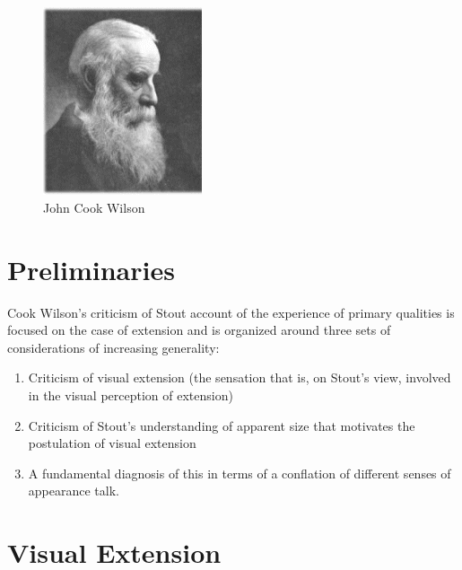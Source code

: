 \documentclass[11pt]{article}
\title{\mytitle\\
\mysubtitle}
\author{\myauthor}
\date{} %
\begin{document}
\maketitle

\setlength{\parindent}{1em}


\begin{figure}[htbp]
	\centering
		\includegraphics[scale=1]{../../graphics/wilson.jpg}
	\caption{John Cook Wilson}
	\label{fig:wilson}
\end{figure}

\section{Preliminaries}\label{sec:preliminaries} %

Cook Wilson's criticism of Stout account of the experience of primary qualities is focused on the case of extension and is organized around three sets of considerations of increasing generality:
    \begin{enumerate}
        \item Criticism of visual extension (the sensation that is, on Stout's view, involved in the visual perception of extension)
        \item Criticism of Stout's understanding of apparent size that motivates the postulation of visual extension
        \item A fundamental diagnosis of this in terms of a conflation of different senses of appearance talk.
    \end{enumerate}


\section{Visual Extension}\label{sec:visual_extension} %
\end{document}
